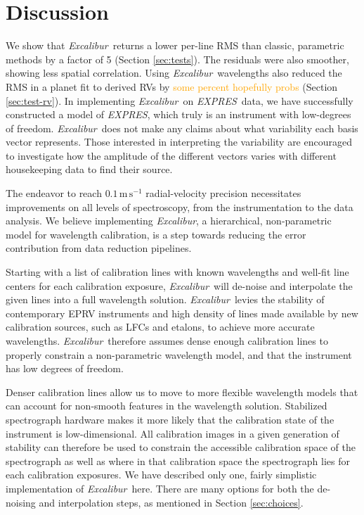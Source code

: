 \documentclass[modern]{aastex63}
\newcommand{\project}[1]{\textsl{#1}}
\newcommand{\name}{\project{Excalibur}}
\newcommand{\acronym}[1]{{\small{#1}}}
\newcommand{\expres}{\project{\acronym{EXPRES}}}
\newcommand{\lz}[1]{\textcolor{orange}{#1}}
\newcommand{\mps}{\mathrm{m\,s^{-1}}}
\begin{document}
\section{Discussion} \label{sec:discussion}
We show that \name\ returns a lower per-line RMS than classic, parametric methods by a factor of 5 (Section \ref{sec:tests}).  The residuals were also smoother, showing less spatial correlation.  Using \name\ wavelengths also reduced the RMS in a planet fit to derived RVs by \lz{some percent hopefully probs} (Section \ref{sec:test-rv}).  In implementing \name\ on \expres\ data, we have successfully constructed a model of \expres, which truly is an instrument with low-degrees of freedom.  \name\ does not make any claims about what variability each basis vector represents.  Those interested in interpreting the variability are encouraged to investigate how the amplitude of the different vectors varies with different housekeeping data to find their source.

The endeavor to reach $0.1\,\mps$ radial-velocity precision necessitates improvements on all levels of spectroscopy, from the instrumentation to the data analysis.  We believe implementing \name, a hierarchical, non-parametric model for wavelength calibration, is a step towards reducing the error contribution from data reduction pipelines.

Starting with a list of calibration lines with known wavelengths and well-fit line centers for each calibration exposure, \name\ will de-noise and interpolate the given lines into a full wavelength solution.  \name\ levies the stability of contemporary EPRV instruments and high density of lines made available by new calibration sources, such as LFCs and etalons, to achieve more accurate wavelengths.  \name\ therefore assumes dense enough calibration lines to properly constrain a non-parametric wavelength model, and that the instrument has low degrees of freedom.

Denser calibration lines allow us to move to more flexible wavelength models that can account for non-smooth features in the wavelength solution.  Stabilized spectrograph hardware makes it more likely that the calibration state of the instrument is low-dimensional.  All calibration images in a given generation of stability can therefore be used to constrain the accessible calibration space of the spectrograph as well as where in that calibration space the spectrograph lies for each calibration exposures.  We have described only one, fairly simplistic implementation of \name\ here.  There are many options for both the de-noising and interpolation steps, as mentioned in Section \ref{sec:choices}.
\end{document}

